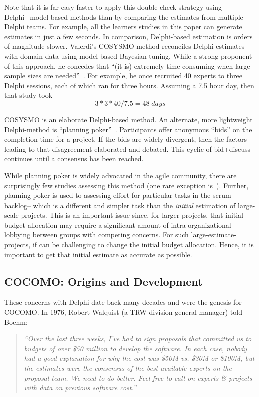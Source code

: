 \documentclass{sig-alternate}
\newenvironment{changed}{\par\color{MyDarkBlue}}{\par}
\begin{document}
\begin{changed}



Note that it is far easy faster to apply this double-check strategy using Delphi+model-based methods 
than by comparing the estimates from multiple Delphi teams.
For example, all the learners studies in this paper can generate estimates
in just a few seconds. In comparison, Delphi-based estimation is orders of magnitude slower. 
Valerdi's  
COSYSMO method reconciles Delphi-estimates 
with domain data using  model-based Bayesian tuning.
While a strong proponent of this approach, he concedes that 
``(it is)  extremely time
consuming when large sample sizes are needed''~\cite{valerdi11}.
For example, he once
recruited 40 experts to three Delphi sessions, each of which ran for three hours.
Assuming a 7.5 hour day,
then that study took \[3*3*40 /7.5 = 48\; \mathit{days}\]

COSYSMO is an elaborate Delphi-based method. An alternate, more lightweight Delphi-method is  ``planning poker''~\cite{molokk08}.
Participants offer anonymous
``bids'' on the 
completion time for a project. If  the bids are widely divergent, then the factors
leading to that disagreement elaborated and debated. This cyclic of bid+discuss continues
until a consensus has been reached.

While planning poker is widely advocated in the agile community,
there are surprisingly few studies assessing this method (one rare exception is~\cite{molokk08}).
Further,   planning poker is used to assessing effort
for particular tasks in the scrum backlog-- which is a different and simpler task
than the {\em initial} estimation of  large-scale
projects. This is an important issue since, for larger
projects, that initial budget allocation may require a significant amount of intra-organizational lobbying between groups with competing concerns. For such large-estimate-projects, if can
be challenging to change the initial budget allocation. Hence, it is important to get
that initial estimate as accurate as possible.

\end{changed}
\subsection{COCOMO: Origins and Development}
These concerns with  Delphi  date
back many decades and were the genesis for  COCOMO. In 1976, Robert Walquist (a TRW division general manager)
told  Boehm: \begin{quote}{\em ``Over the last three
weeks, I've had to sign proposals that committed us
to budgets of over \$50 million to develop the
software.  In each case, nobody had a good
explanation for why the cost was \$50M vs. \$30M or
\$100M, but the estimates were the consensus of the
best available experts on the proposal team.  We
need to do better. Feel free to call on experts
\& projects with data on previous software cost.''}\end{quote}
\end{document}
